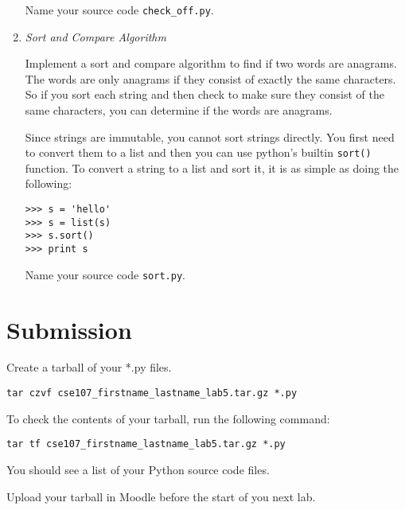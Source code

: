 \documentclass[12pt]{article}
\begin{document}
\begin{enumerate}
  
Name your source code \texttt{check\_off.py}.

\item \emph{Sort and Compare Algorithm}

Implement a sort and compare algorithm to find if two words are anagrams. The words are only anagrams if they consist of exactly the same characters. So if you sort each string and then check to make sure they consist of the same characters, you can determine if the words are anagrams. 

Since strings are immutable, you cannot sort strings directly. You first need to convert them to a list and then you can use python's builtin \texttt{sort()} function. To convert a string to a list and sort it, it is as simple as doing the following:

\begin{verbatim}
>>> s = 'hello'
>>> s = list(s)
>>> s.sort()
>>> print s
\end{verbatim}


Name your source code \texttt{sort.py}. 

  


\end{enumerate}








\section*{Submission}

Create a tarball of your *.py files.

\begin{lstlisting}[style=bash]
tar czvf cse107_firstname_lastname_lab5.tar.gz *.py
\end{lstlisting}


To check the contents of your tarball, run the following command:

\begin{lstlisting}[style=bash]
tar tf cse107_firstname_lastname_lab5.tar.gz *.py
\end{lstlisting}

You should see a list of your Python source code files.

Upload your tarball in Moodle before the start of you next lab.
\end{document}

